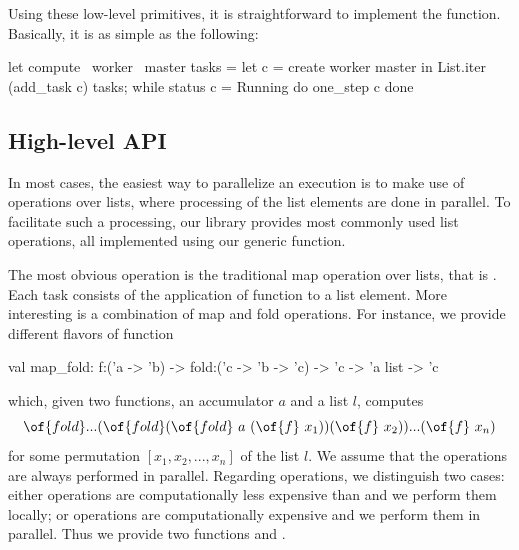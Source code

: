 \documentclass{llncs}
\begin{document}
Using these low-level primitives, it is straightforward to implement
the  function. Basically, it is as simple as the following:
\begin{ocaml}
let compute ~worker ~master tasks =
  let c = create worker master in
  List.iter (add_task c) tasks;
  while status c = Running do one_step c done
\end{ocaml}

\subsection{High-level API}\label{sec:derived}

In most cases, the easiest way to parallelize an execution is to make
use of operations over lists, where processing of the
list elements are done in parallel. 
To facilitate such a processing,
our library provides most commonly used list operations, all 
implemented using our generic  function.

The most obvious operation is the traditional map operation over
lists, that is .
Each task consists of the application of function  to a list element.
More interesting is a combination of map and fold operations.
For instance, we provide different flavors of function
\begin{ocaml}
  val map_fold: f:('a -> 'b) -> fold:('c -> 'b -> 'c) -> 'c -> 'a list -> 'c
\end{ocaml}
which, given two functions, an accumulator $a$ and a list $l$, computes
\begin{equation}\label{eq:map-fold}
  \of{fold} ... (\of{fold} (\of{fold} ~ a ~ (\of{f} ~ x_1)) (\of{f} ~ x_2))
  ... (\of{f} ~ x_n)
\end{equation}
for some permutation $[x_1,x_2,...,x_n]$ of the list $l$.
We assume that the  operations are always performed in parallel.
Regarding  operations, we distinguish two cases:
either  operations are computationally less expensive
than  and we perform them locally;
or  operations are computationally expensive and we
perform them in parallel.
Thus we provide two functions  and .
\end{document}
